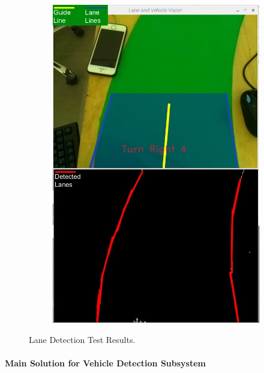 \documentclass[a4paper,12pt]{article}
\begin{document}
\begin{figure}[H]
\begin{subfigure}{.5\textwidth}
	  		\caption{\label{fig:detection-case1} }
		\end{subfigure}%
		\begin{subfigure}{.5\textwidth}
	  		\centering
			\includegraphics[width=0.48\unitlength]{images/detection2-legend}
	  		\caption{\label{fig:detection-case2}}
		\end{subfigure}
	\caption{\label{fig:detection-test-results}Lane Detection Test Results. }
	\end{figure}
	
	

	
	\paragraph{Main Solution for  Vehicle Detection Subsystem}
	
\end{document}
